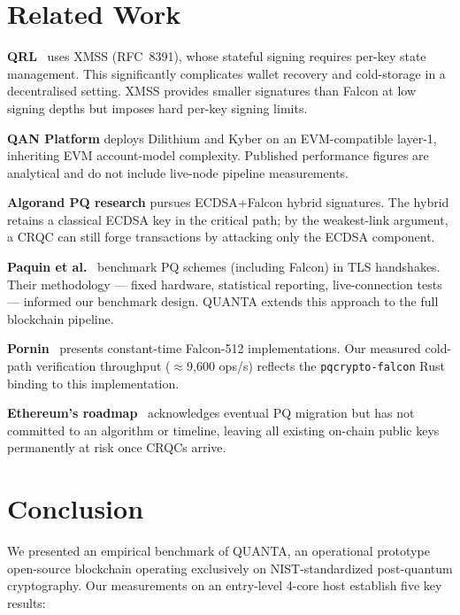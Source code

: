 \documentclass[11pt,a4paper]{article}
\begin{document}
\section{Related Work}
\label{sec:related}
\textbf{QRL}~\cite{hulsing2018} uses XMSS (RFC~8391), whose stateful signing
requires per-key state management. This significantly complicates wallet
recovery and cold-storage in a decentralised setting. XMSS provides smaller
signatures than Falcon at low signing depths but imposes hard per-key
signing limits.

\textbf{QAN Platform} deploys Dilithium and Kyber on an EVM-compatible layer-1,
inheriting EVM account-model complexity. Published performance figures are
analytical and do not include live-node pipeline measurements.

\textbf{Algorand PQ research} pursues ECDSA+Falcon hybrid signatures. The
hybrid retains a classical ECDSA key in the critical path; by the weakest-link
argument, a CRQC can still forge transactions by attacking only the ECDSA
component.

\textbf{Paquin et al.}~\cite{paquin2020} benchmark PQ schemes (including Falcon)
in TLS handshakes. Their methodology --- fixed hardware, statistical reporting,
live-connection tests --- informed our benchmark design. QUANTA extends this
approach to the full blockchain pipeline.

\textbf{Pornin}~\cite{pornin2022} presents constant-time Falcon-512
implementations. Our measured cold-path verification throughput ($\approx$9,600 ops/s) reflects
the \texttt{pqcrypto-falcon} Rust binding to this implementation.

\textbf{Ethereum's roadmap}~\cite{buterin2023} acknowledges eventual PQ
migration but has not committed to an algorithm or timeline, leaving all
existing on-chain public keys permanently at risk once CRQCs arrive.

\section{Conclusion}
\label{sec:conclusion}
We presented an empirical benchmark of QUANTA, an operational prototype
open-source blockchain operating exclusively on NIST-standardized
post-quantum cryptography. Our measurements on an entry-level 4-core host
establish five key results:
\end{document}
